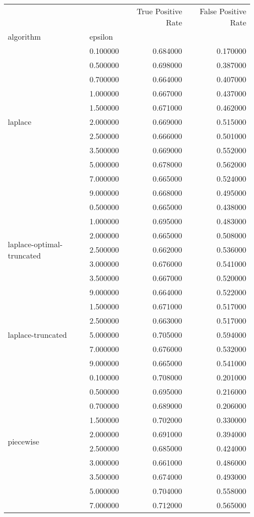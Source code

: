 \begin{tabular}{llrr}
\toprule
 &  & True Positive Rate & False Positive Rate \\
algorithm & epsilon &  &  \\
\midrule
\multirow[t]{11}{*}{laplace} & 0.100000 & 0.684000 & 0.170000 \\
 & 0.500000 & 0.698000 & 0.387000 \\
 & 0.700000 & 0.664000 & 0.407000 \\
 & 1.000000 & 0.667000 & 0.437000 \\
 & 1.500000 & 0.671000 & 0.462000 \\
 & 2.000000 & 0.669000 & 0.515000 \\
 & 2.500000 & 0.666000 & 0.501000 \\
 & 3.500000 & 0.669000 & 0.552000 \\
 & 5.000000 & 0.678000 & 0.562000 \\
 & 7.000000 & 0.665000 & 0.524000 \\
 & 9.000000 & 0.668000 & 0.495000 \\
\cline{1-4}
\multirow[t]{7}{*}{laplace-optimal-truncated} & 0.500000 & 0.665000 & 0.438000 \\
 & 1.000000 & 0.695000 & 0.483000 \\
 & 2.000000 & 0.665000 & 0.508000 \\
 & 2.500000 & 0.662000 & 0.536000 \\
 & 3.000000 & 0.676000 & 0.541000 \\
 & 3.500000 & 0.667000 & 0.520000 \\
 & 9.000000 & 0.664000 & 0.522000 \\
\cline{1-4}
\multirow[t]{5}{*}{laplace-truncated} & 1.500000 & 0.671000 & 0.517000 \\
 & 2.500000 & 0.663000 & 0.517000 \\
 & 5.000000 & 0.705000 & 0.594000 \\
 & 7.000000 & 0.676000 & 0.532000 \\
 & 9.000000 & 0.665000 & 0.541000 \\
\cline{1-4}
\multirow[t]{10}{*}{piecewise} & 0.100000 & 0.708000 & 0.201000 \\
 & 0.500000 & 0.695000 & 0.216000 \\
 & 0.700000 & 0.689000 & 0.206000 \\
 & 1.500000 & 0.702000 & 0.330000 \\
 & 2.000000 & 0.691000 & 0.394000 \\
 & 2.500000 & 0.685000 & 0.424000 \\
 & 3.000000 & 0.661000 & 0.486000 \\
 & 3.500000 & 0.674000 & 0.493000 \\
 & 5.000000 & 0.704000 & 0.558000 \\
 & 7.000000 & 0.712000 & 0.565000 \\
\cline{1-4}
\bottomrule
\end{tabular}
